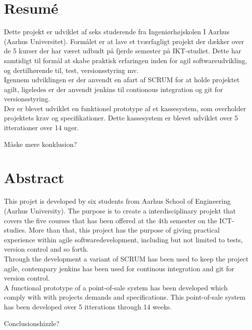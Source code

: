\section*{Resumé}
Dette projekt er udviklet af seks studerende fra Ingeniørhøjskolen I Aarhus (Aarhus Universitet). Formålet er at lave et tværfagligt projekt der dækker over de 5 kurser der har været udbudt på fjerde semester på IKT-studiet. Dette har samtidigt til formål at skabe praktisk erfaringen inden for agil softwareudvikling, og dertilhørende til, test, versionsstyring mv.\\
Igennem udviklingen er der anvendt en afart af SCRUM for at holde projektet agilt, ligeledes er der anvendt jenkins til contionous integration og git for versionsstyring. \\
Der er blevet udviklet en funktionel prototype af et kassesystem, som overholder projektets krav og specifikationer. Dette kassesystem er blevet udviklet over 5 itterationer over 14 uger.

Måske mere konklusion?


\section*{Abstract}
This projet is developed by six students from Aarhus School of Engineering (Aarhus University). The purpose is to create a interdisciplinary projekt that covers the five courses that has been offered at the 4th semester on the ICT-studies. More than that, this project has the purpose of giving practical experience within agile softwaredevelopment, including but not limited to tests, version control and so forth.\\
Through the development a variant of SCRUM has been used to keep the project agile, contempary jenkins has been used for continous integration and git for version control.\\
A functional prototype of a point-of-sale system has been developed which comply with with projects demands and specifications. This point-of-sale system has been developed over 5 itterations through 14 weeks.

Conclusionshizzle?